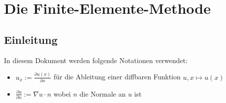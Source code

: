 
\chapter{Die Finite-Elemente-Methode}
\setcounter{section}{-1}
\section{Einleitung}
In diesem Dokument werden folgende Notationen verwendet:
\begin{itemize}
\item $u_x:=\frac{\partial u(x)}{\partial x}$ für die Ableitung einer diffbaren Funktion $u, x\mapsto u(x)$
\item $\frac{\partial u}{\partial n}:=\nabla u\cdot n$ wobei $n$ die Normale an $u$ ist
\end{itemize}


